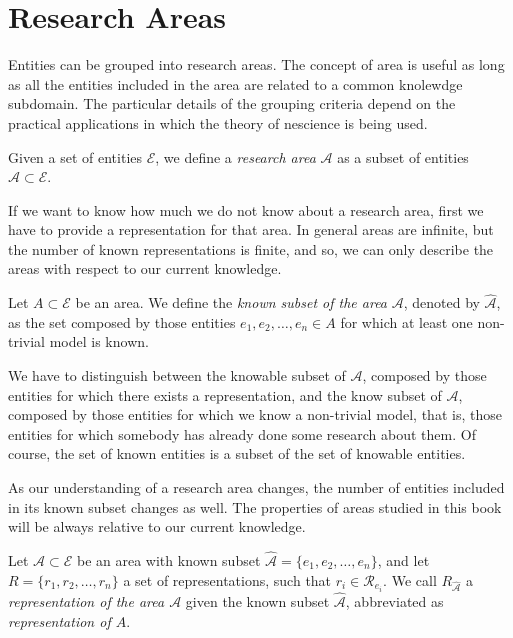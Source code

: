 %
%

\section{Research Areas}
\label{sec:areas}

Entities can be grouped into research areas. The concept of area is useful as long as all the entities included in the area are related to a common knolewdge subdomain. The particular details of the grouping criteria depend on the practical applications in which the theory of nescience is being used.

\begin{definition}
Given a set of entities $\mathcal{E}$, we define a \emph{research area} $\mathcal{A}$ as a subset of entities $\mathcal{A} \subset \mathcal{E}$.
\end{definition}

If we want to know how much we do not know about a research area, first we have to provide a representation for that area. In general areas are infinite, but the number of known representations is finite, and so, we can only describe the areas with respect to our current knowledge.

\begin{definition}
Let $A \subset \mathcal{E}$ be an area. We define the \emph{known subset of the area} $\mathcal{A}$, denoted by $\hat{\mathcal{A}}$, as the set composed by those entities $e_1, e_2, \ldots, e_n \in A$ for which at least one non-trivial model is known.
\end{definition}

We have to distinguish between the knowable subset of $\mathcal{A}$, composed by those entities for which there exists a representation, and the know subset of $\mathcal{A}$, composed by those entities for which we know a non-trivial model, that is, those entities for which somebody has already done some research about them. Of course, the set of known entities is a subset of the set of knowable entities.

As our understanding of a research area changes, the number of entities included in its known subset changes as well. The properties of areas studied in this book will be always relative to our current knowledge.

\begin{definition}
Let $\mathcal{A} \subset \mathcal{E}$ be an area with known subset $\hat{\mathcal{A}} = \{ e_1, e_2, \ldots, e_n \}$, and let  $R = \{ r_1, r_2, \ldots, r_n \}$ a set of representations, such that $r_i \in \mathcal{R}_{e_i}$. We call $R_{\hat{\mathcal{A}}}$ a \emph{representation of the area $\mathcal{A}$} given the known subset $\hat{\mathcal{A}}$, abbreviated as \emph{representation of $A$}.
\end{definition}

